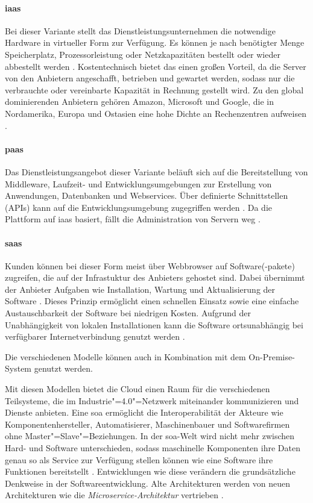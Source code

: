 \paragraph{\ac{iaas}} Bei dieser Variante stellt das Dienstleistungsunternehmen die notwendige Hardware in virtueller Form zur Verfügung. Es können je nach benötigter Menge Speicherplatz, Prozessorleistung oder Netzkapazitäten bestellt oder wieder abbestellt werden \citep{Dzombeta2017}. Kostentechnisch bietet das einen großen Vorteil, da die Server von den Anbietern angeschafft, betrieben und gewartet werden, sodass nur die verbrauchte oder vereinbarte Kapazität in Rechnung gestellt wird. Zu den global dominierenden Anbietern gehören Amazon, Microsoft und Google, die in Nordamerika, Europa und Ostasien eine hohe Dichte an Rechenzentren aufweisen \citep{Acharya2019}.

\paragraph{\ac{paas}} Das Dienstleistungsangebot dieser Variante beläuft sich auf die Bereitstellung von Middleware, Laufzeit- und Entwicklungsumgebungen zur Erstellung von Anwendungen, Datenbanken und Webservices. Über definierte Schnittstellen (APIs) kann auf die Entwicklungsumgebung zugegriffen werden \citep{Dzombeta2017}. Da die Plattform auf \ac{iaas} basiert, fällt die Administration von Servern weg \citep{Acharya2019}.

\paragraph{\ac{saas}} Kunden können bei dieser Form meist über Webbrowser auf Software(-pakete) zugreifen, die auf der Infrastuktur des Anbieters gehostet sind. Dabei übernimmt der Anbieter Aufgaben wie Installation, Wartung und Aktualisierung der Software \citep{Utecht2018}. Dieses Prinzip ermöglicht einen schnellen Einsatz sowie eine einfache Austauschbarkeit der Software bei niedrigen Kosten. Aufgrund der Unabhängigkeit von lokalen Installationen kann die Software ortsunabhängig bei verfügbarer Internetverbindung genutzt werden \citep{Dzombeta2017}.

\vspace{0.5cm}
\noindent Die verschiedenen Modelle können auch in Kombination mit dem On-Premise-System genutzt werden.

\noindent Mit diesen Modellen bietet die Cloud einen Raum für die verschiedenen Teilsysteme, die im Industrie"=4.0"=Netzwerk miteinander kommunizieren und Dienste anbieten. Eine \acf{soa} ermöglicht die Interoperabilität der Akteure wie Komponentenhersteller, Automatisierer, Maschinenbauer und Softwarefirmen ohne Master"=Slave"=Beziehungen. In der \ac{soa}-Welt wird nicht mehr zwischen Hard- und Software unterschieden, sodass maschinelle Komponenten ihre Daten genau so als Service zur Verfügung stellen können wie eine Software ihre Funktionen bereitstellt \citep{Adolphs2017}. Entwicklungen wie diese verändern die grundsätzliche Denkweise in der Softwareentwicklung. Alte Architekturen werden von neuen Architekturen wie die \textit{Microservice-Architektur} vertrieben \citep{Acharya2019}.

